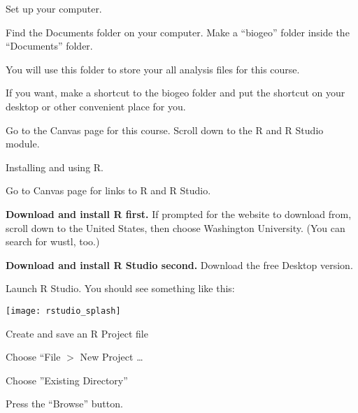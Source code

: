 \documentclass[t]{beamer}
\begin{document}

\begin{frame}[t,plain]{Set up your computer.}
	
	\hangpara Find the Documents folder on your computer. Make a “biogeo” folder inside the “Documents” folder. 
	
	\hangpara You will use this folder to store your all analysis files for this course.
	
	\hangpara If you want, make a shortcut to the biogeo folder and put the shortcut on your desktop or other convenient place for you.
	
	\hangpara Go to the Canvas page for this course. Scroll down to the R and R Studio module.
	
\end{frame}


\begin{frame}[t,plain]{Installing and using R.}

\begin{multicols}{2}

\hangpara Go to Canvas page for links to R and R Studio.

\hangpara \textbf{Download and install R first.} If prompted for the website to download from, scroll down to the United States, then choose Washington University. (You can search for wustl, too.)

\hangpara \textbf{Download and install R Studio second.} Download the free Desktop version.

\columnbreak

\noindent Launch R Studio.  You should see something like this:

\noindent\texttt{[image: rstudio\_splash]}
\end{multicols}

\end{frame}



\begin{frame}{Create and save an R Project file}

	\hangpara Choose “File $>$ New Project \dots\end{frame}

	\hangpara Choose ”Existing Directory”
	
	\hangpara Press the “Browse” button. 
\end{document}
